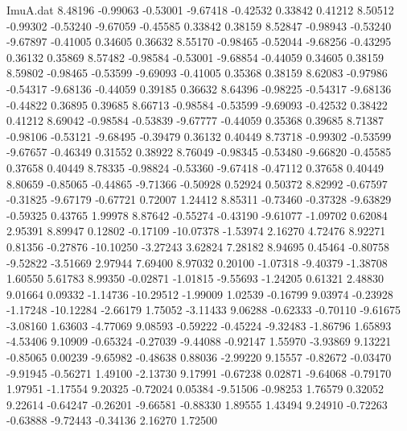 \begin{filecontents}{ImuA.dat}
   8.48196   -0.99063   -0.53001   -9.67418   -0.42532    0.33842    0.41212
   8.50512   -0.99302   -0.53240   -9.67059   -0.45585    0.33842    0.38159
   8.52847   -0.98943   -0.53240   -9.67897   -0.41005    0.34605    0.36632
   8.55170   -0.98465   -0.52044   -9.68256   -0.43295    0.36132    0.35869
   8.57482   -0.98584   -0.53001   -9.68854   -0.44059    0.34605    0.38159
   8.59802   -0.98465   -0.53599   -9.69093   -0.41005    0.35368    0.38159
   8.62083   -0.97986   -0.54317   -9.68136   -0.44059    0.39185    0.36632
   8.64396   -0.98225   -0.54317   -9.68136   -0.44822    0.36895    0.39685
   8.66713   -0.98584   -0.53599   -9.69093   -0.42532    0.38422    0.41212
   8.69042   -0.98584   -0.53839   -9.67777   -0.44059    0.35368    0.39685
   8.71387   -0.98106   -0.53121   -9.68495   -0.39479    0.36132    0.40449
   8.73718   -0.99302   -0.53599   -9.67657   -0.46349    0.31552    0.38922
   8.76049   -0.98345   -0.53480   -9.66820   -0.45585    0.37658    0.40449
   8.78335   -0.98824   -0.53360   -9.67418   -0.47112    0.37658    0.40449
   8.80659   -0.85065   -0.44865   -9.71366   -0.50928    0.52924    0.50372
   8.82992   -0.67597   -0.31825   -9.67179   -0.67721    0.72007    1.24412
   8.85311   -0.73460   -0.37328   -9.63829   -0.59325    0.43765    1.99978
   8.87642   -0.55274   -0.43190   -9.61077   -1.09702    0.62084    2.95391
   8.89947    0.12802   -0.17109  -10.07378   -1.53974    2.16270    4.72476
   8.92271    0.81356   -0.27876  -10.10250   -3.27243    3.62824    7.28182
   8.94695    0.45464   -0.80758   -9.52822   -3.51669    2.97944    7.69400
   8.97032    0.20100   -1.07318   -9.40379   -1.38708    1.60550    5.61783
   8.99350   -0.02871   -1.01815   -9.55693   -1.24205    0.61321    2.48830
   9.01664    0.09332   -1.14736  -10.29512   -1.99009    1.02539   -0.16799
   9.03974   -0.23928   -1.17248  -10.12284   -2.66179    1.75052   -3.11433
   9.06288   -0.62333   -0.70110   -9.61675   -3.08160    1.63603   -4.77069
   9.08593   -0.59222   -0.45224   -9.32483   -1.86796    1.65893   -4.53406
   9.10909   -0.65324   -0.27039   -9.44088   -0.92147    1.55970   -3.93869
   9.13221   -0.85065    0.00239   -9.65982   -0.48638    0.88036   -2.99220
   9.15557   -0.82672   -0.03470   -9.91945   -0.56271    1.49100   -2.13730
   9.17991   -0.67238    0.02871   -9.64068   -0.79170    1.97951   -1.17554
   9.20325   -0.72024    0.05384   -9.51506   -0.98253    1.76579    0.32052
   9.22614   -0.64247   -0.26201   -9.66581   -0.88330    1.89555    1.43494
   9.24910   -0.72263   -0.63888   -9.72443   -0.34136    2.16270    1.72500

\end{filecontents}
